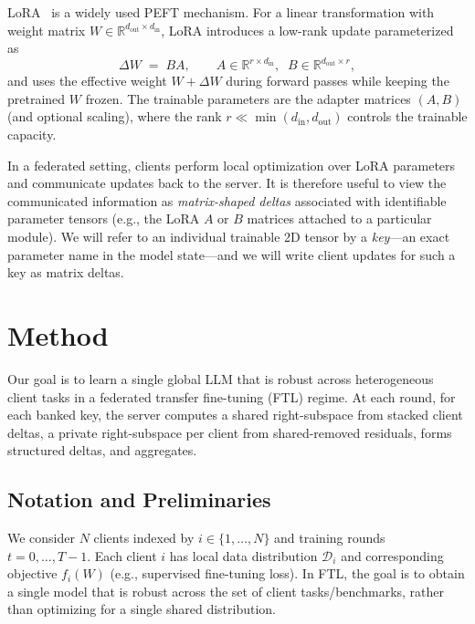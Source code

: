 \documentclass{article}
\theoremstyle{plain}
\theoremstyle{definition}
\theoremstyle{remark}
\begin{document}
LoRA~\citet{hu2022lora} is a widely used PEFT mechanism. For a linear transformation with weight matrix $W\in\mathbb{R}^{d_{\mathrm{out}}\times d_{\mathrm{in}}}$, LoRA introduces a low-rank update parameterized as
\[
\Delta W \;=\; B A,\qquad
A\in\mathbb{R}^{r\times d_{\mathrm{in}}},\;\;
B\in\mathbb{R}^{d_{\mathrm{out}}\times r},
\]
and uses the effective weight $W+\Delta W$ during forward passes while keeping the pretrained $W$ frozen. The trainable parameters are the adapter matrices $(A,B)$ (and optional scaling), where the rank $r\ll \min(d_{\mathrm{in}},d_{\mathrm{out}})$ controls the trainable capacity.

In a federated setting, clients perform local optimization over LoRA parameters and communicate updates back to the server. It is therefore useful to view the communicated information as \emph{matrix-shaped deltas} associated with identifiable parameter tensors (e.g., the LoRA $A$ or $B$ matrices attached to a particular module). We will refer to an individual trainable 2D tensor by a \emph{key}---an exact parameter name in the model state---and we will write client updates for such a key as matrix deltas. 


\section{Method}
\label{sec:method}

Our goal is to learn a single global LLM that is robust across heterogeneous client tasks in a federated transfer fine-tuning (FTL) regime. At each round, for each banked key, the server computes a shared right-subspace from stacked client deltas, a private right-subspace per client from shared-removed residuals, forms structured deltas, and aggregates.

\subsection{Notation and Preliminaries}
\label{sec:method-protocol}

We consider $N$ clients indexed by $i\in\{1,\dots,N\}$ and training rounds $t=0,\dots,T-1$. Each client $i$ has local data distribution $\mathcal{D}_i$ and corresponding objective $f_i(W)$ (e.g., supervised fine-tuning loss). In FTL, the goal is to obtain a single model that is robust across the set of client tasks/benchmarks, rather than optimizing for a single shared distribution.
\end{document}
